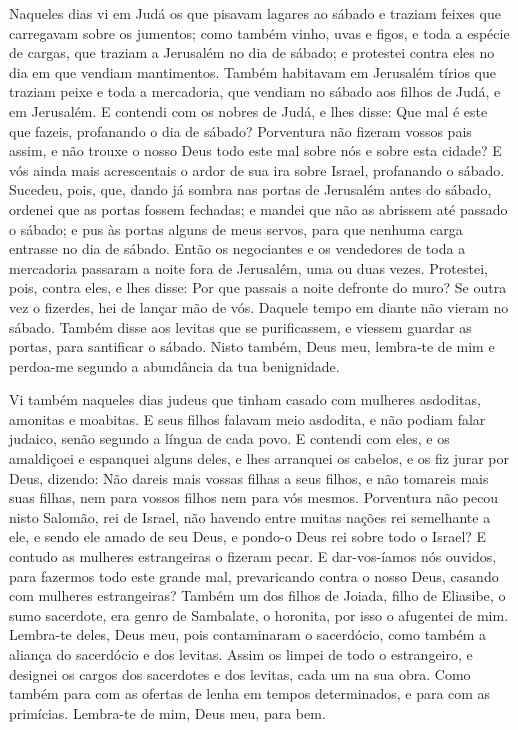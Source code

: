 Naqueles dias vi em Judá os que pisavam lagares ao sábado e
traziam feixes que carregavam sobre os jumentos; como também vinho,
uvas e figos, e toda a espécie de cargas, que traziam a Jerusalém no
dia de sábado; e protestei contra eles no dia em que vendiam
mantimentos. Também habitavam em Jerusalém tírios que traziam
peixe e toda a mercadoria, que vendiam no sábado aos filhos de Judá,
e em Jerusalém. E contendi com os nobres de Judá, e lhes
disse: Que mal é este que fazeis, profanando o dia de sábado?
Porventura não fizeram vossos pais assim, e não trouxe o
nosso Deus todo este mal sobre nós e sobre esta cidade? E vós ainda
mais acrescentais o ardor de sua ira sobre Israel, profanando o
sábado. Sucedeu, pois, que, dando já sombra nas portas de
Jerusalém antes do sábado, ordenei que as portas fossem fechadas; e
mandei que não as abrissem até passado o sábado; e pus às portas
alguns de meus servos, para que nenhuma carga entrasse no dia de
sábado. Então os negociantes e os vendedores de toda a
mercadoria passaram a noite fora de Jerusalém, uma ou duas vezes.
Protestei, pois, contra eles, e lhes disse: Por que passais a
noite defronte do muro? Se outra vez o fizerdes, hei de lançar mão
de vós. Daquele tempo em diante não vieram no sábado. Também
disse aos levitas que se purificassem, e viessem guardar as portas,
para santificar o sábado. Nisto também, Deus meu, lembra-te de mim e
perdoa-me segundo a abundância da tua benignidade.

Vi também naqueles dias judeus que tinham casado com mulheres
asdoditas, amonitas e moabitas. E seus filhos falavam meio
asdodita, e não podiam falar judaico, senão segundo a língua de cada
povo. E contendi com eles, e os amaldiçoei e espanquei alguns
deles, e lhes arranquei os cabelos, e os fiz jurar por Deus,
dizendo: Não dareis mais vossas filhas a seus filhos, e não tomareis
mais suas filhas, nem para vossos filhos nem para vós mesmos.
Porventura não pecou nisto Salomão, rei de Israel, não
havendo entre muitas nações rei semelhante a ele, e sendo ele amado
de seu Deus, e pondo-o Deus rei sobre todo o Israel? E contudo as
mulheres estrangeiras o fizeram pecar. E dar-vos-íamos nós
ouvidos, para fazermos todo este grande mal, prevaricando contra o
nosso Deus, casando com mulheres estrangeiras? Também um dos
filhos de Joiada, filho de Eliasibe, o sumo sacerdote, era genro de
Sambalate, o horonita, por isso o afugentei de mim. Lembra-te
deles, Deus meu, pois contaminaram o sacerdócio, como também a
aliança do sacerdócio e dos levitas. Assim os limpei de todo
o estrangeiro, e designei os cargos dos sacerdotes e dos levitas,
cada um na sua obra. Como também para com as ofertas de lenha
em tempos determinados, e para com as primícias. Lembra-te de mim,
Deus meu, para bem.

